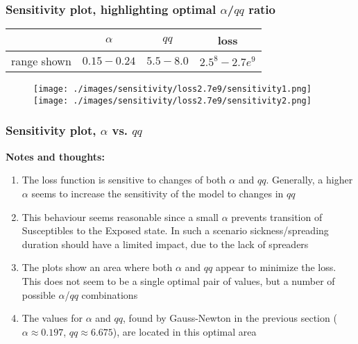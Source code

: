 \documentclass{beamer}
\begin{document}
\begin{frame}
	\frametitle{Sensitivity plot, highlighting optimal $\alpha$/$qq$ ratio}
	\begin{center}
		\begin{tabular}{|c|c|c|c|}
			\hline & $\alpha$ & $qq$ & loss \\
			\hline range shown & $0.15-0.24$ & $5.5-8.0$ & $2.5^{8}-2.7e^{9}$\\
			\hline
		\end{tabular}
		\begin{figure}
				\hspace{-1.4cm}
				\texttt{[image: ./images/sensitivity/loss2.7e9/sensitivity1.png]}\hspace{-1cm}%
				\texttt{[image: ./images/sensitivity/loss2.7e9/sensitivity2.png]}
		\end{figure}
	\end{center}
\end{frame}

\begin{frame}
	\frametitle{Sensitivity plot, $\alpha$ vs. $qq$}
	\textbf{Notes and thoughts:}
	\begin{enumerate}[$\bullet$]
		\item The loss function is sensitive to changes of both $\alpha$ and $qq$. Generally, a higher $\alpha$
			seems to increase the sensitivity of the model to changes in $qq$
		\item This behaviour seems reasonable since a small $\alpha$ prevents transition of Susceptibles to the Exposed state. In such a scenario
			sickness/spreading duration should have a limited impact, due to the lack of spreaders
		\item The plots show an area where both $\alpha$ and $qq$ appear to minimize the loss. This does not seem to be a single optimal pair of values,
			but a number of possible $\alpha$/$qq$ combinations
		\item The values for $\alpha$ and $qq$, found by Gauss-Newton in the previous section ($\alpha \approx 0.197$, $qq \approx 6.675$),
			are located in this optimal area
	\end{enumerate}
\end{frame}
\end{document}
